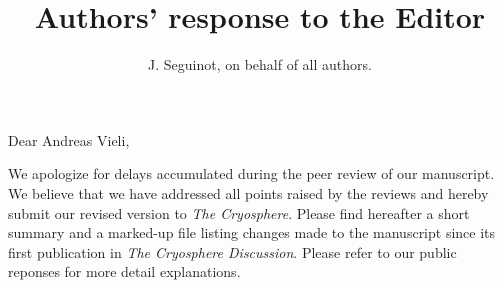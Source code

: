 

\title{Authors' response to the Editor}
\author{J. Seguinot, on behalf of all authors.}


\maketitle
\bigskip


    Dear Andreas Vieli,

    We apologize for delays accumulated during the peer review of our
    manuscript. We believe that we have addressed all points raised by the
    reviews and hereby submit our revised version to \emph{The Cryosphere}.
    Please find hereafter a short summary and a marked-up file listing
    changes made to the manuscript since its first publication in \emph{The
    Cryosphere Discussion}. Please refer to our public reponses for more
    detail explanations.

